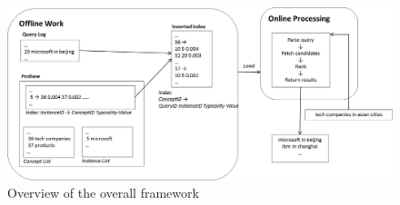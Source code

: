 \begin{figure}
\centering
\includegraphics[scale=0.5]{images/Figure1}
\caption{Overview of the overall framework}
\label{fig:system}
\end{figure}
